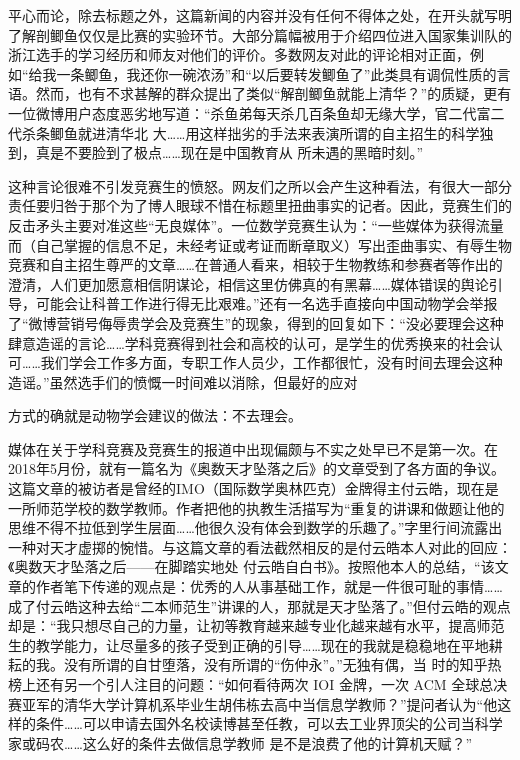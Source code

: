 \documentclass{article}
\begin{document}
平⼼⽽论，除去标题之外，这篇新闻的内容并没有任何不得体之处，在开头就写明了解剖鲫鱼仅仅是⽐赛的实验环节。⼤部分篇幅被⽤于介绍四位进⼊国家集训队的浙江选⼿的学习经历和师友对他们的评价。多数⽹友对此的评论相对正⾯，例如“给我⼀条鲫鱼，我还你⼀碗浓汤”和“以后要转发鲫鱼了”此类具有调侃性质的⾔语。然⽽，也有不求甚解的群众提出了类似“解剖鲫鱼就能上清华？”的质疑，更有⼀位微博⽤户态度恶劣地写道：“杀鱼弟每天杀⼏百条鱼却⽆缘⼤学，官⼆代富⼆代杀条鲫鱼就进清华北
\newpage
⼤……⽤这样拙劣的⼿法来表演所谓的⾃主招⽣的科学独到，真是不要脸到了极点……现在是中国教育从
所未遇的⿊暗时刻。” 

这种⾔论很难不引发竞赛⽣的愤怒。⽹友们之所以会产⽣这种看法，有很⼤⼀部分责任要归咎于那个为了博⼈眼球不惜在标题⾥扭曲事实的记者。因此，竞赛⽣们的反击⽭头主要对准这些“⽆良媒体”。⼀位数学竞赛⽣认为：“⼀些媒体为获得流量⽽（⾃⼰掌握的信息不⾜，未经考证或考证⽽断章取义）写出歪曲事实、有辱⽣物竞赛和⾃主招⽣尊严的⽂章……在普通⼈看来，相较于⽣物教练和参赛者等作出的澄清，⼈们更加愿意相信阴谋论，相信这⾥仿佛真的有⿊幕……媒体错误的舆论引导，可能会让科普⼯作进⾏得⽆⽐艰难。”还有⼀名选⼿直接向中国动物学会举报了“微博营销号侮辱贵学会及竞赛⽣”的现象，得到的回复如下：“没必要理会这种肆意造谣的⾔论……学科竞赛得到社会和⾼校的认可，是学⽣的优秀换来的社会认可……我们学会⼯作多⽅⾯，专职⼯作⼈员少，⼯作都很忙，没有时间去理会这种造谣。”虽然选⼿们的愤慨⼀时间难以消除，但最好的应对
\newpage

⽅式的确就是动物学会建议的做法：不去理会。 

媒体在关于学科竞赛及竞赛⽣的报道中出现偏颇与不实之处早已不是第⼀次。在2018年5⽉份，就有⼀篇名为《奥数天才坠落之后》的⽂章受到了各⽅⾯的争议。这篇⽂章的被访者是曾经的IMO（国际数学奥林匹克）⾦牌得主付云皓，现在是⼀所师范学校的数学教师。作者把他的执教⽣活描写为“重复的讲课和做题让他的思维不得不拉低到学⽣层⾯……他很久没有体会到数学的乐趣了。”字⾥⾏间流露出⼀种对天才虚掷的惋惜。与这篇⽂章的看法截然相反的是付云皓本⼈对此的回应：《奥数天才坠落之后——在脚踏实地处 付云皓⾃⽩书》。按照他本⼈的总结，“该⽂章的作者笔下传递的观点是：优秀的⼈从事基础⼯作，就是⼀件很可耻的事情……成了付云皓这种去给“⼆本师范⽣”讲课的⼈，那就是天才坠落了。”但付云皓的观点却是：“我只想尽⾃⼰的⼒量，让初等教育越来越专业化越来越有⽔平，提⾼师范⽣的教学能⼒，让尽量多的孩⼦受到正确的引导……现在的我就是稳稳地在平地耕耘的我。没有所谓的⾃⽢堕落，没有所谓的“伤仲永”。”⽆独有偶，当
\newpage
时的知乎热榜上还有另⼀个引⼈注⽬的问题：“如何看待两次 IOI ⾦牌，⼀次 ACM 全球总决赛亚军的清华⼤学计算机系毕业⽣胡伟栋去⾼中当信息学教师？”提问者认为“他这样的条件……可以申请去国外名校读博甚⾄任教，可以去⼯业界顶尖的公司当科学家或码农……这么好的条件去做信息学教师
是不是浪费了他的计算机天赋？” 
\end{document}
